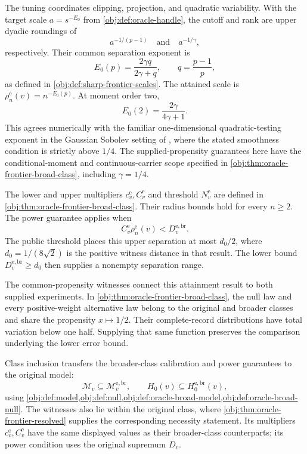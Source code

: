 The tuning coordinates clipping, projection, and quadratic variability. With the target scale \(a=s^{-E_0}\) from \cref{obj:def:oracle-handle}, the cutoff and rank are upper dyadic roundings of
\[
a^{-1/(p-1)}
\quad\text{and}\quad
a^{-1/\gamma},
\]
respectively. Their common separation exponent is
\[
E_0(p)=\frac{2\gamma q}{2\gamma+q},
\qquad q=\frac{p-1}{p},
\]
as defined in \cref{obj:def:sharp-frontier-scales}. The attained scale is \(\rho_n^{\mathrm e}(v)=n^{-E_0(p)}\). At moment order two,
\[
E_0(2)=\frac{2\gamma}{4\gamma+1}.
\]
This agrees numerically with the familiar one-dimensional quadratic-testing exponent in the Gaussian Sobolev setting of \citet[Section~6.1, pp.~249--250]{IngsterSapatinas2009GoodnessOfFit}, where the stated smoothness condition is strictly above \(1/4\). The supplied-propensity guarantees here have the conditional-moment and continuous-carrier scope specified in \cref{obj:thm:oracle-frontier-broad-class}, including \(\gamma=1/4\).

The lower and upper multipliers \(c_v^{\mathrm e},C_v^{\mathrm e}\) and threshold \(N_v^{\mathrm e}\) are defined in \cref{obj:thm:oracle-frontier-broad-class}. Their radius bounds hold for every \(n\ge2\). The power guarantee applies when
\[
C_v^{\mathrm e}\rho_n^{\mathrm e}(v)<D_v^{\mathrm{e,br}}.
\]
The public threshold places this upper separation at most \(d_0/2\), where \(d_0=1/(8\sqrt2)\) is the positive witness distance in that result. The lower bound \(D_v^{\mathrm{e,br}}\ge d_0\) then supplies a nonempty separation range.

The common-propensity witnesses connect this attainment result to both supplied experiments. In \cref{obj:thm:oracle-frontier-broad-class}, the null law and every positive-weight alternative law belong to the original and broader classes and share the propensity \(x\mapsto1/2\). Their complete-record distributions have total variation below one half. Supplying that same function preserves the comparison underlying the lower error bound.

Class inclusion transfers the broader-class calibration and power guarantees to the original model:
\[
\mathcal M_v\subseteq\mathcal M_v^{\mathrm{e,br}},
\qquad
H_0(v)\subseteq H_0^{\mathrm{e,br}}(v),
\]
using \cref{obj:def:model,obj:def:null,obj:def:oracle-broad-model,obj:def:oracle-broad-null}. The witnesses also lie within the original class, where \cref{obj:thm:oracle-frontier-resolved} supplies the corresponding necessity statement. Its multipliers \(c^{\mathrm e}_v,C^{\mathrm e}_v\) have the same displayed values as their broader-class counterparts; its power condition uses the original supremum \(D_v\).

